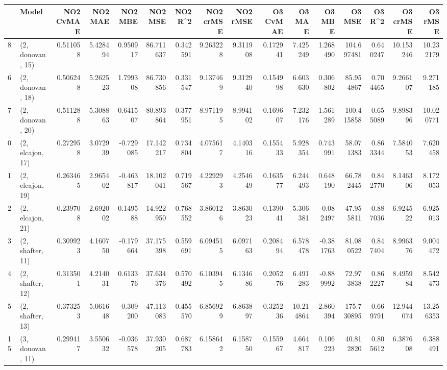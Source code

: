 \begin{tabular}{llrrrrrrrrrrrrrr}
\toprule
{} &             Model &  NO2 CvMAE &   NO2 MAE &   NO2 MBE &    NO2 MSE &   NO2 R\textasciicircum2 &  NO2 crMSE &  NO2 rMSE &  O3 CvMAE &     O3 MAE &    O3 MBE &      O3 MSE &    O3 R\textasciicircum2 &   O3 crMSE &    O3 rMSE \\
\midrule
8  &  (2, donovan, 15) &   0.511058 &  5.428494 &  0.950917 &  86.711637 &  0.342591 &   9.263228 &  9.311908 &  0.172941 &   7.425249 &  1.268490 &  104.697481 &  0.640247 &  10.153246 &  10.232179 \\
6  &  (2, donovan, 18) &   0.506248 &  5.262523 &  1.799308 &  86.730856 &  0.331547 &   9.137469 &  9.312940 &  0.154998 &   6.603630 &  0.306802 &   85.954867 &  0.704465 &   9.266107 &   9.271185 \\
7  &  (2, donovan, 20) &   0.511288 &  5.308863 &  0.641507 &  80.893864 &  0.377951 &   8.971195 &  8.994102 &  0.169607 &   7.232176 &  1.561289 &  100.415858 &  0.655089 &   9.898396 &  10.020771 \\
0  &  (2, elcajon, 17) &   0.272958 &  3.072939 & -0.729085 &  17.142217 &  0.734804 &   4.075617 &  4.140316 &  0.155433 &   5.928354 &  0.743991 &   58.071383 &  0.863344 &   7.584053 &   7.620458 \\
1  &  (2, elcajon, 19) &   0.263465 &  2.965402 & -0.463817 &  18.102041 &  0.719567 &   4.229293 &  4.254649 &  0.163577 &   6.244493 &  0.648190 &   66.782445 &  0.842770 &   8.146306 &   8.172053 \\
2  &  (2, elcajon, 21) &   0.239708 &  2.692002 &  0.149588 &  14.922950 &  0.768552 &   3.860126 &  3.863023 &  0.139041 &   5.306381 & -0.082497 &   47.955811 &  0.887036 &   6.924522 &   6.925013 \\
3  &  (2, shafter, 11) &   0.309923 &  4.160750 & -0.179664 &  37.175398 &  0.559691 &   6.094515 &  6.097163 &  0.208494 &   6.578478 & -0.381763 &   81.080522 &  0.847404 &   8.996376 &   9.004472 \\
4  &  (2, shafter, 12) &   0.313501 &  4.214031 &  0.613376 &  37.634376 &  0.570492 &   6.103945 &  6.134686 &  0.205276 &   6.491283 & -0.889992 &   72.973838 &  0.862227 &   8.495984 &   8.542473 \\
5  &  (2, shafter, 13) &   0.373253 &  5.061648 & -0.309200 &  47.113083 &  0.455570 &   6.856929 &  6.863897 &  0.325236 &  10.214864 &  2.860394 &  175.730895 &  0.669791 &  12.944074 &  13.256353 \\
15 &  (3, donovan, 11) &   0.299417 &  3.550632 & -0.036578 &  37.930205 &  0.687783 &   6.158642 &  6.158750 &  0.155967 &   4.664817 &  0.106223 &   40.812820 &  0.805612 &   6.387608 &   6.388491 \\

\end{tabular}
